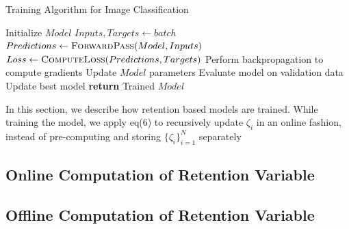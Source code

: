 \begin{algorithm}
    \caption{Training Algorithm for Image Classification}
    \begin{algorithmic}[1]
        \State Initialize $Model$
                \State $Inputs, Targets \gets batch$
                \State $Predictions \gets \Call{ForwardPass}{Model, Inputs}$
                \State $Loss \gets \Call{ComputeLoss}{Predictions, Targets}$
                \State Perform backpropagation to compute gradients
                \State Update $Model$ parameters
            \EndFor
            \State Evaluate model on validation data
                \State Update best model
            \EndIf
        \EndFor
        \State \textbf{return} Trained $Model$
    \EndProcedure
    \end{algorithmic}
    \end{algorithm}
    

In this section, we describe how retention based models are trained. 
While training the model, we apply eq(6) to recursively update $\zeta_i$ in an online fashion, instead of pre-computing and storing $\{\zeta_i\}_{i=1}^N$ separately

\subsection{Online Computation of Retention Variable}

\subsection{Offline Computation of Retention Variable}



